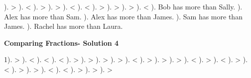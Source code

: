 \documentclass{article}%
\begin{document}
). >%
). <%
). >%
). >%
). <%
). <%
). >%
). >%
). >%
). <%
). Bob has more than Sally.%
). Alex has more than Sam.%
). Alex has more than James.%
). Sam has more than James.%
). Rachel has more than Laura.%
\newline%
\newpage%
\large%
\begin{center}%
\textbf{Comparing Fractions- Solution 4}%
\newline%
\end{center} \normalsize%
1). >%
). <%
). <%
). <%
). >%
). >%
). >%
). >%
). <%
). >%
). >%
). >%
). <%
). >%
). <%
). >%
). <%
). >%
). >%
). <%
). <%
). >%
). >%
). >%
\end{document}
